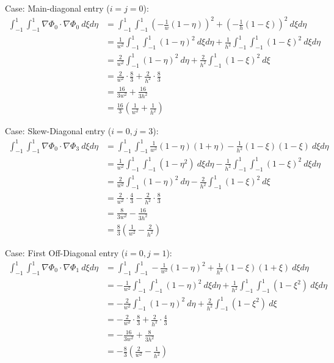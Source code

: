 \documentclass[12pt]{article}
\begin{document}
Case: Main-diagonal entry ($i=j=0$):
\begin{align*}
\int_{-1}^{1} \int_{-1}^{1} \nabla \Phi_0 \cdot \nabla \Phi_0 \ d\xi d\eta &= \int_{-1}^{1} \int_{-1}^{1} \left(-\frac{1}{w}(1-\eta)\right)^2 + \left(-\frac{1}{h}(1-\xi)\right)^2 \ d\xi d\eta \\
&= \frac{1}{w^2} \int_{-1}^1 \int_{-1}^1 (1-\eta)^2 \ d\xi d\eta + \frac{1}{h^2} \int_{-1}^1 \int_{-1}^1 (1-\xi)^2 \ d\xi d\eta \\
&= \frac{2}{w^2} \int_{-1}^1 (1-\eta)^2 \ d\eta + \frac{2}{h^2}\int_{-1}^1 (1-\xi)^2 \ d\xi \\
&= \frac{2}{w^2} \cdot \frac{8}{3} + \frac{2}{h^2} \cdot \frac{8}{3}\\
&= \frac{16}{3w^2} + \frac{16}{3h^2}\\
&= \frac{16}{3} \left(\frac{1}{w^2} + \frac{1}{h^2}\right)
\end{align*}

Case: Skew-Diagonal entry ($i=0, j=3$):
\begin{align*}
    \int_{-1}^{1} \int_{-1}^{1} \nabla \Phi_0 \cdot \nabla \Phi_3 \ d\xi d\eta &= \int_{-1}^{1} \int_{-1}^{1} \frac{1}{w^2}(1-\eta)(1+\eta) - \frac{1}{h^2}(1-\xi)(1-\xi) \ d\xi d\eta \\
&= \frac{1}{w^2} \int_{-1}^1 \int_{-1}^1 (1-\eta^2) \ d\xi d\eta - \frac{1}{h^2} \int_{-1}^1 \int_{-1}^1 (1-\xi)^2 \ d\xi d\eta \\
&= \frac{2}{w^2} \int_{-1}^1 (1-\eta)^2 \ d\eta - \frac{2}{h^2}\int_{-1}^1 (1-\xi)^2 \ d\xi \\
&= \frac{2}{w^2} \cdot \frac{4}{3} - \frac{2}{h^2} \cdot \frac{8}{3}\\
&= \frac{8}{3w^2} - \frac{16}{3h^2}\\
&= \frac{8}{3} \left(\frac{1}{w^2} - \frac{2}{h^2}\right)
\end{align*}

Case: First Off-Diagonal entry ($i=0, j=1$):
\begin{align*}
    \int_{-1}^{1} \int_{-1}^{1} \nabla \Phi_0 \cdot \nabla \Phi_1 \ d\xi d\eta &= \int_{-1}^{1} \int_{-1}^{1} -\frac{1}{w^2}(1-\eta)^2 + \frac{1}{h^2}(1-\xi)(1+\xi) \ d\xi d\eta \\
    &= -\frac{1}{w^2} \int_{-1}^1 \int_{-1}^1 (1-\eta)^2 \ d\xi d\eta + \frac{1}{h^2} \int_{-1}^1 \int_{-1}^1 (1-\xi^2) \ d\xi d\eta \\
    &= -\frac{2}{w^2} \int_{-1}^1 (1-\eta)^2 \ d\eta + \frac{2}{h^2}\int_{-1}^1 (1-\xi^2) \ d\xi \\
    &= -\frac{2}{w^2} \cdot \frac{8}{3} + \frac{2}{h^2} \cdot \frac{4}{3}\\
    &= -\frac{16}{3w^2} + \frac{8}{3h^2}\\
    &= -\frac{8}{3} \left(\frac{2}{w^2} - \frac{1}{h^2}\right)
\end{align*}
\end{document}
